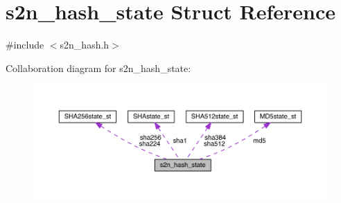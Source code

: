 \hypertarget{structs2n__hash__state}{}\section{s2n\+\_\+hash\+\_\+state Struct Reference}
\label{structs2n__hash__state}


{\ttfamily \#include $<$s2n\+\_\+hash.\+h$>$}



Collaboration diagram for s2n\+\_\+hash\+\_\+state\+:\nopagebreak
\begin{figure}[H]
\begin{center}
\leavevmode
\includegraphics[width=350pt]{structs2n__hash__state__coll__graph}
\end{center}
\end{figure}
